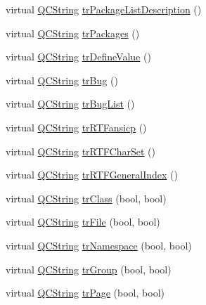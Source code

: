 \begin{DoxyCompactItemize}
\item 
virtual \hyperlink{class_q_c_string}{Q\-C\-String} \hyperlink{class_translator_chinesetraditional_aafd776ddbb24f5b3cf7c2f39c80f8652}{tr\-Package\-List\-Description} ()
\item 
virtual \hyperlink{class_q_c_string}{Q\-C\-String} \hyperlink{class_translator_chinesetraditional_a5b648094fc927e3078e9af28c26f8bba}{tr\-Packages} ()
\item 
virtual \hyperlink{class_q_c_string}{Q\-C\-String} \hyperlink{class_translator_chinesetraditional_ae6be6e403011f5b069dde07447839f9e}{tr\-Define\-Value} ()
\item 
virtual \hyperlink{class_q_c_string}{Q\-C\-String} \hyperlink{class_translator_chinesetraditional_abfa1d6c97f4c2967ebbd515db5590ec6}{tr\-Bug} ()
\item 
virtual \hyperlink{class_q_c_string}{Q\-C\-String} \hyperlink{class_translator_chinesetraditional_a6922767c9b6ff214503967c6f8b66468}{tr\-Bug\-List} ()
\item 
virtual \hyperlink{class_q_c_string}{Q\-C\-String} \hyperlink{class_translator_chinesetraditional_ac711f1a109c3c8131bf02a9ff6f48e36}{tr\-R\-T\-Fansicp} ()
\item 
virtual \hyperlink{class_q_c_string}{Q\-C\-String} \hyperlink{class_translator_chinesetraditional_af3bba50fd4e382b113171e132e88719b}{tr\-R\-T\-F\-Char\-Set} ()
\item 
virtual \hyperlink{class_q_c_string}{Q\-C\-String} \hyperlink{class_translator_chinesetraditional_a6a04ffa0f1114981e258cf0a94478c98}{tr\-R\-T\-F\-General\-Index} ()
\item 
virtual \hyperlink{class_q_c_string}{Q\-C\-String} \hyperlink{class_translator_chinesetraditional_ad8c64e35c495c244af4789193470ac59}{tr\-Class} (bool, bool)
\item 
virtual \hyperlink{class_q_c_string}{Q\-C\-String} \hyperlink{class_translator_chinesetraditional_adf139dd9fe888beb95529f5f7c498dab}{tr\-File} (bool, bool)
\item 
virtual \hyperlink{class_q_c_string}{Q\-C\-String} \hyperlink{class_translator_chinesetraditional_a8dd21a354edf39217c1354f284c9f2d5}{tr\-Namespace} (bool, bool)
\item 
virtual \hyperlink{class_q_c_string}{Q\-C\-String} \hyperlink{class_translator_chinesetraditional_aeff16d1c6102c748b39e42066d9ed4e6}{tr\-Group} (bool, bool)
\item 
virtual \hyperlink{class_q_c_string}{Q\-C\-String} \hyperlink{class_translator_chinesetraditional_ade6d056ddd5658a8211f5a14c86a7893}{tr\-Page} (bool, bool)

\end{DoxyCompactItemize}
